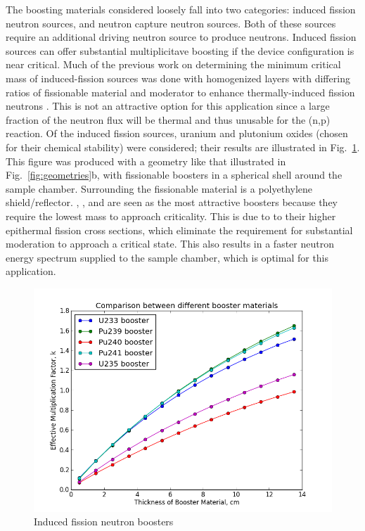 \documentclass{mc2015}
\begin{document}
The boosting materials considered loosely fall into two categories: induced fission neutron sources, and neutron capture neutron sources. Both of these sources require an additional driving neutron source to produce neutrons. Induced fission sources can offer substantial multiplicitave boosting if the device configuration is near critical.  Much of the previous work on determining the minimum critical mass of induced-fission sources  was done with homogenized layers with differing ratios of fissionable material and moderator to enhance thermally-induced fission neutrons \cite{karni_semi-automated_keff,karni_smores_2003,goluoglu_smoresnew_2002}. This is not an attractive option for this application since a large fraction of the neutron flux will be thermal and thus unusable for the (n,p) reaction. Of the induced fission sources, uranium and plutonium oxides (chosen for their chemical stability) were considered; their results are illustrated in Fig.\ \ref{fig:boosters}. This figure was produced with a geometry like that illustrated in Fig.\ \ref{fig:geometries}b, with fissionable boosters in a spherical shell around the sample chamber. Surrounding the fissionable material is a polyethylene shield/reflector. , , and  are seen as the most attractive boosters because they require the lowest mass to approach criticality. This is due to to their higher epithermal fission cross sections, which eliminate the requirement for substantial moderation to approach a critical state. This also results in a faster neutron energy spectrum supplied to the sample chamber, which is optimal for this application. 

\begin{figure}
  \centering
  \includegraphics[width=4.5in]{Boosters.png}
  \caption{Induced fission neutron boosters}
  \label{fig:boosters}
\end{figure}
\end{document}
